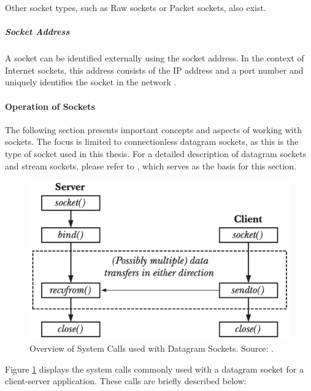 Other socket types, such as Raw sockets or Packet sockets, also exist.


\subparagraph{Socket Address}
A socket can be identified externally using the socket address. In the context of Internet sockets, this address consists of the IP address and a port number and uniquely identifies the socket in the network \cite{sock02}.


\paragraph{Operation of Sockets}

The following section presents important concepts and aspects of working with sockets. The focus is limited to connectionless datagram sockets, as this is the type of socket used in this thesis. For a detailed description of datagram sockets and stream sockets, please refer to \cite{like03}, which serves as the basis for this section.

\begin{figure}[h]
    \centering
    \includegraphics[width=0.75\linewidth]{figures/linux_nwstack/image01.png}
    \caption[Overview of System Calls used with Datagram Sockets]{Overview of System Calls used with Datagram Sockets. Source: \cite{like03}.}
    \label{fig:SocketOperations}
\end{figure}

Figure \ref{fig:SocketOperations} displays the system calls commonly used with a datagram socket for a client-server application. These calls are briefly described below:

